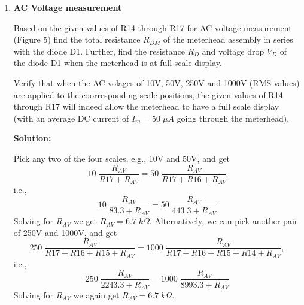 \begin{enumerate}
  {\bf Solution:}

  As shown in Figure 4, the circuit for each scale of the DC voltage measurement 
  is a voltage divider with an internal resistance for the meterhead:
  \begin{itemize}
  \item 0.5V
    \[
    0.5\;\frac{5}{R6+5}=0.25,\;\;\;\;\;\;\;R6=5\;k\Omega
    \]
  \item 2.5V
    \[
    2.5\;\frac{5}{R5+R6+5}=0.25,\;\;\;\;\;\;\;R5=40\;k\Omega
    \]
  \item 10V
    \[
    10\;\frac{5}{R4+R5+R6+5}=0.25,\;\;\;\;\;\;\;R4=150\;k\Omega
    \]
  \item 50V
    \[
    50\;\frac{5}{R3+R4+R5+R6+5}=0.25,\;\;\;\;\;\;\;R3=800\;k\Omega
    \]
  \item 250V
    \[
    250\;\frac{5}{R2+R3+R4+R5+R6+5}=0.25,\;\;\;\;\;\;\;R2=4\;M\Omega
    \]
  \item 1000V
    \[
    1000\;\frac{5}{R1+R2+R3+R4+R5+R6+5}=0.25,\;\;\;\;\;\;\;R1=15\;M\Omega
    \]
  \end{itemize}

\item {\bf AC Voltage measurement}

  Based on the given values of R14 through R17 for AC voltage measurement
  (Figure 5) find the total resistance $R_{DM}$ of the meterhead assembly 
  in series with the diode D1. Further, find the resistance $R_D$ and 
  voltage drop $V_D$ of the diode D1 when the meterhead is at full scale 
  display. 

  Verify that when the AC volages of 10V, 50V, 250V and 1000V (RMS values) 
  are applied to the coorresponding scale positions, the given values of
  R14 through R17 will indeed allow the meterhead to have a full scale 
  display (with an average DC current of $I_m=50\;\mu A$ going through 
  the meterhead).

  {\bf Solution:}

  Pick any two of the four scales, e.g., 10V and 50V, and get
  \[
  10\;\frac{R_{AV}}{R17+R_{AV}}=50\;\frac{R_{AV}}{R17+R16+R_{AV}}
  \]
  i.e.,
  \[
  10\;\frac{R_{AV}}{83.3+R_{AV}}=50\;\frac{R_{AV}}{443.3+R_{AV}}
  \]
  Solving for $R_{AV}$ we get $R_{AV}=6.7\;k\Omega$. Alternatively, we can 
  pick another pair of 250V and 1000V, and get
  \[
  250\;\frac{R_{AV}}{R17+R16+R15+R_{AV}}=1000\;\frac{R_{AV}}{R17+R16+R15+R14+R_{AV}},
  \]
  i.e.,
  \[
  250\;\frac{R_{AV}}{2243.3+R_{AV}}=1000\;\frac{R_{AV}}{8993.3+R_{AV}}
  \]
  Solving for $R_{AV}$ we again get $R_{AV}=6.7\;k\Omega$. 
  

\end{enumerate}
